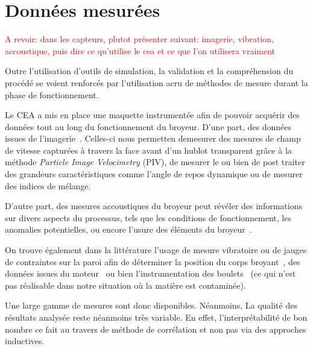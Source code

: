 \section{Données mesurées}

\textcolor{red}{A revoir: dans les capteurs, plutot présenter suivant: imagerie, vibration, accoustique, puis dire ce qu'utilise le cea et ce que l'on utilisera vraiment}

Outre l'utilisation d'outils de simulation, la validation et la compréhension du procédé se voient renforcés par l'utilisation acru de méthodes de mesure durant la phase de fonctionnement.

Le CEA a mis en place une maquette instrumentée afin de pouvoir acquérir des données tout au long du fonctionnement du broyeur. D'une part, des données issues de l'imagerie~\cite{jarray_wet_2019,Adepu, }. Celles-ci nous permetten demesurer des mesures de champ de vitesse capturées à travers la face avant d'un hublot transparent grâce à la méthode \textit{Particle Image Velocimetry} (PIV), de mesurer le ou bien de post traiter des grandeurs caractéristiques comme l'angle de repos dynamique ou de mesurer des indices de mélange.

D'autre part, des mesures accoustiques du broyeur peut révéler des informations sur divers aspects du processus, tels que les conditions de fonctionnement, les anomalies potentielles, ou encore l'usure des éléments du broyeur~\cite{Owusu, almond}.

On trouve également dans la littérature l'usage de mesure vibratoire ou de jauges de contraintes sur la paroi afin de déterminer la position du corps broyant~\cite{Davey, tano_2005}, des données issues du moteur~\cite{pedrayes_frequency_2017} ou bien l'instrumentation des boulets~\cite{Wang} (ce qui n'est pas réalisable dans notre situation où la matière est contaminée).

Une large gamme de mesures sont donc disponibles. Néanmoins, La qualité des résultats analysée reste néanmoins très variable. En effet, l'interprétabilité de bon nombre ce fait au travers de méthode de corrélation et non pas via des approches inductives.

